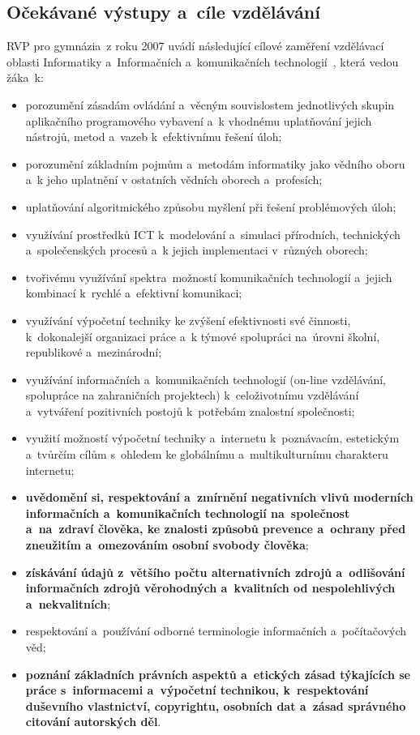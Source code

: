 \documentclass[a4paper, 12pt]{article}
\begin{document}
\subsection{Očekávané výstupy a~cíle vzdělávání}
RVP pro gymnázia~z roku 2007 uvádí následující cílové zaměření vzdělávací oblasti Informatiky a~Informačních a~komunikačních technologií~\cite{rvpGym}, která vedou žáka~k:
\begin{itemize}
    \setlength{\itemsep}{-3pt}
    \item porozumění zásadám ovládání a~věcným souvislostem jednotlivých skupin aplikačního programového
vybavení a~k vhodnému uplatňování jejich nástrojů, metod a~vazeb k~efektivnímu řešení úloh;
    \item porozumění základním pojmům a~metodám informatiky jako vědního oboru a~k jeho uplatnění
v ostatních vědních oborech a~profesích;
    \item uplatňování algoritmického způsobu myšlení při řešení problémových úloh;
    \item využívání prostředků ICT k~modelování a~simulaci přírodních, technických a~společenských procesů
a~k jejich implementaci v~různých oborech;
    \item tvořivému využívání spektra~možností komunikačních technologií a~jejich kombinací k~rychlé
a~efektivní komunikaci;
    \item využívání výpočetní techniky ke zvýšení efektivnosti své činnosti, k~dokonalejší organizaci práce
a~k týmové spolupráci na~úrovni školní, republikové a~mezinárodní;
    \item využívání informačních a~komunikačních technologií (on-line vzdělávání, spolupráce na
zahraničních projektech) k~celoživotnímu vzdělávání a~vytváření pozitivních postojů k~potřebám
znalostní společnosti;
    \item využití možností výpočetní techniky a~internetu k~poznávacím, estetickým a~tvůrčím cílům s~ohledem ke globálnímu a~multikulturnímu charakteru internetu;
    \item \textbf{uvědomění si, respektování a~zmírnění negativních vlivů moderních informačních a~komunikačních technologií na~společnost a~na~zdraví člověka, ke znalosti způsobů prevence a~ochrany před zneužitím a~omezováním osobní svobody člověka};
    \item \textbf{získávání údajů z~většího počtu alternativních zdrojů a~odlišování informačních zdrojů věrohodných a~kvalitních od nespolehlivých a~nekvalitních};
    \item respektování a~používání odborné terminologie informačních a~počítačových věd;
    \item \textbf{poznání základních právních aspektů a~etických zásad týkajících se práce s~informacemi a~výpočetní technikou, k~respektování duševního vlastnictví, copyrightu, osobních dat a~zásad správného citování autorských děl}.
\end{itemize}
\end{document}
